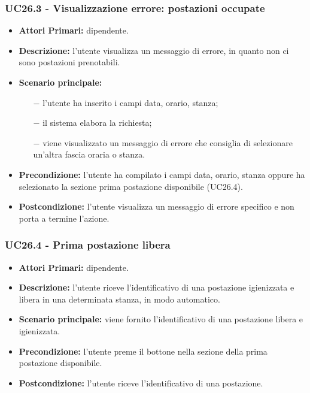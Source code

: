 \subsubsection{ UC26.3 - Visualizzazione errore: postazioni occupate }
\begin{itemize}
	\item\textbf{Attori Primari:} dipendente.
	\item\textbf{Descrizione:} l’utente visualizza un messaggio di errore, in quanto non ci sono postazioni prenotabili.
	\item\textbf{Scenario principale:} 
	\begin{itemize}
		\item[$-$] l’utente ha inserito i campi data, orario, stanza;
		\item[$-$] il sistema elabora la richiesta;
		\item[$-$] viene visualizzato un messaggio di errore che consiglia di selezionare un'altra fascia oraria o stanza.
	\end{itemize}
	\item\textbf{Precondizione:} l’utente ha compilato i campi data, orario, stanza oppure ha selezionato la sezione prima postazione disponibile (UC26.4).
	\item\textbf{Postcondizione:} l’utente visualizza un messaggio di errore specifico e non porta a termine l’azione.
\end{itemize}
\subsubsection{ UC26.4 - Prima postazione libera }
\begin{itemize}
	\item\textbf{Attori Primari:} dipendente.
	\item\textbf{Descrizione:} l’utente riceve l'identificativo di una postazione igienizzata e libera in una determinata stanza, 
	in modo automatico.
	\item\textbf{Scenario principale:} viene fornito l'identificativo di una postazione libera e igienizzata.
	\item\textbf{Precondizione:} l’utente preme il bottone nella sezione della prima postazione disponibile.
	\item\textbf{Postcondizione:} l’utente riceve l'identificativo di una postazione.
\end{itemize}
